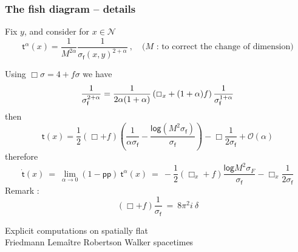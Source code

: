 \documentclass[9pt]{beamer}
\renewcommand{\log}{\mathsf{log}}
\newcommand{\pp}{\mathsf{pp}}
\newcommand{\Ncal}{\mathcal{N}}
\newcommand{\Ocal}{\mathcal{O}}
\newcommand{\fsf}{\mathsf{f}}
\newcommand{\tsf}{\mathsf{t}}
\begin{document}
\begin{frame}

\frametitle{The fish diagram -- details}
 
Fix $y$, and consider for $x \in \Ncal$
\begin{equation*}
\tsf^\alpha(x) = \frac{1}{M^{2\alpha}} \frac{1}{\sigma_\fsf(x,y)^{2+\alpha}} \ , \quad \mbox{($M$ : to correct the change of dimension)}
\end{equation*}

Using $\Box \sigma = 4 + f \sigma$ we have
%
\begin{equation*}
\frac{1}{\sigma_\fsf^{2+\alpha}}=\frac{1}{2\alpha(1+\alpha)}\left(\Box_x+(1+\alpha)f\right)\frac{1}{\sigma_\fsf^{1+\alpha}} 
\vspace*{-6pt}
\end{equation*}
%
then
%
\begin{equation*}
 \tsf(x) = \frac{1}{2} (\Box + f) \left( \frac{1}{\alpha \sigma_\fsf} - \frac{\log(M^2\sigma_\fsf)}{\sigma_\fsf} \right) - \Box\frac{1}{2\sigma_\fsf}  + \Ocal(\alpha)
\end{equation*}
%
therefore
%
\vspace*{-6pt}
%
\begin{equation*}
\dot{\tsf}(x) \ = \ \lim_{\alpha\to 0}\left(1-\pp\right) \ \tsf^\alpha(x) \ = \ - \frac{1}{2}(\Box_x+f)\frac{\log M^2 \sigma_F}{\sigma_\fsf}-\Box_x \frac{1}{2\sigma_\fsf} 
\end{equation*}
%
Remark :
%
\vspace*{-8pt}
%
\begin{equation*}
\left( \Box + f \right) \frac{1}{\sigma_\fsf} \ = \ 8 \pi^2 i \ \delta
\end{equation*}

\end{frame}



{
\begin{frame}
\bf
\begin{exampleblock}{\vspace*{-3ex}}
\begin{center}
\Large Explicit computations on spatially flat \\[10pt] Friedmann Lemaître Robertson Walker spacetimes
\end{center}
\end{exampleblock}
\end{frame}
}
\end{document}
